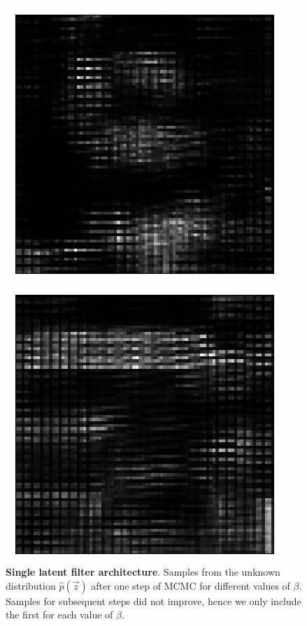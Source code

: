 \begin{figure}[h!]
\begin{multicols}{4}
    \includegraphics[scale=0.4]{figures/results/latent_image/beta_4_posterior_sample_0.png}
    \caption{$\beta=4$}
    \includegraphics[scale=0.4]{figures/results/latent_image/beta_16_posterior_sample_11.png}
    \caption{$\beta=16$}
\end{multicols}
\caption{\textbf{Single latent filter architecture}. Samples from the unknown distribution $\hat{p}(\vec{z})$ after one step of MCMC for different values of $\beta$. Samples for subsequent steps did not improve, hence we only include the first for each value of $\beta$.}
\label{fig:latent_image_originals_posterior_samples}
\end{figure}


